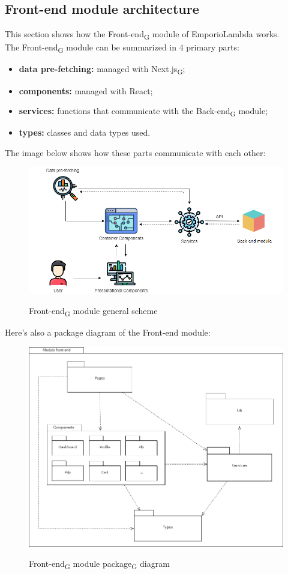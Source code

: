 \subsection{Front-end module architecture}
This section shows how the Front-end\textsubscript{G} module of EmporioLambda works. \\The Front-end\textsubscript{G} module can be summarized in 4 primary parts:
\begin{itemize}
\item \textbf{data pre-fetching:} managed with Next.js\textsubscript{G};
\item \textbf{components:} managed with React;
\item \textbf{services:} functions that communicate with the Back-end\textsubscript{G} module;
\item \textbf{types:} classes and data types used.
\end{itemize} 
The image below shows how these parts communicate with each other:
\begin{figure}[H]
\centering
\includegraphics[scale=0.58]{res/Architettura/Frontend/img/general_frontend}\\
\caption{Front-end\textsubscript{G} module general scheme}
\end{figure}
\newpage
Here's also a package diagram of the Front-end module:
\begin{figure}[H]
\centering
\includegraphics[scale=0.50]{res/Architettura/Frontend/img/package_frontend}\\
\caption{Front-end\textsubscript{G} module package\textsubscript{G} diagram}
\end{figure}
